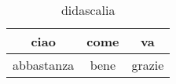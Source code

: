 
\begin{table}
\begin{center}

\begin{tabular}{|c|c|c|}
\hline
ciao& come& va\\
\hline
abbastanza& bene& grazie\\
\hline
\end{tabular}

\caption{didascalia}
\label{riferimento}

\end{center}
\end{table}


